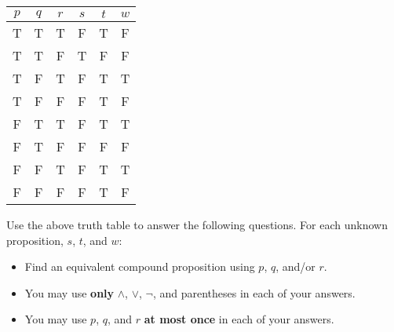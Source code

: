 \documentclass[12pt]{exam}
\begin{document}
\begin{center}
\begin{tabular}{|c c c|| c | c | c |}
\hline
$p$ & $q$ & $r$ & 
\hspace{0.8cm}$s$\hspace{0.8cm} & \hspace{0.8cm}$t$\hspace{0.8cm} & \hspace{0.8cm}$w$\hspace*{0.8cm}\\\hline
T & T & T  & F & T & F\\\hline
T & T & F  & T & F & F\\\hline
T & F & T  & F & T & T\\\hline
T & F & F  & F & T & F\\\hline
F & T & T  & F & T & T\\\hline
F & T & F  & F & F & F\\\hline 
F & F & T  & F & T & T\\\hline
F & F & F  & F & T & F\\\hline
\end{tabular}
\end{center}

Use the above truth table to answer the following questions. For each unknown proposition, $s$, $t$, and $w$: 
\begin{itemize}
    \item Find an equivalent compound proposition using $p$, $q$, and/or $r$. 
    \item You may use \textbf{only} $\land$, $\lor$, $\neg$, and parentheses in each of your answers.  
    \item You may use $p$, $q$, and $r$ \textbf{at most once} in each of your answers.
\end{itemize}
\end{document}
